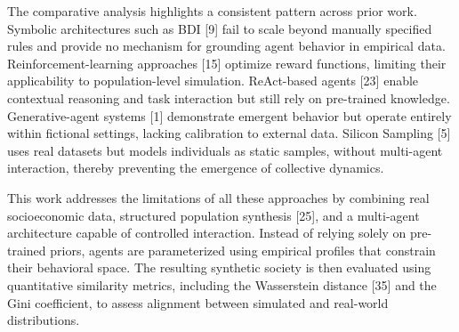 The comparative analysis highlights a consistent pattern across prior work. Symbolic architectures such as BDI [9] fail to scale beyond manually specified rules and provide no mechanism for grounding agent behavior in empirical data. Reinforcement-learning approaches [15] optimize reward functions, limiting their applicability to population-level simulation. ReAct-based agents [23] enable contextual reasoning and task interaction but still rely on pre-trained knowledge. Generative-agent systems [1] demonstrate emergent behavior but operate entirely within fictional settings, lacking calibration to external data. Silicon Sampling [5] uses real datasets but models individuals as static samples, without multi-agent interaction, thereby preventing the emergence of collective dynamics.

This work addresses the limitations of all these approaches by combining real socioeconomic data, structured population synthesis [25], and a multi-agent architecture capable of controlled interaction. Instead of relying solely on pre-trained priors, agents are parameterized using empirical profiles that constrain their behavioral space. The resulting synthetic society is then evaluated using quantitative similarity metrics, including the Wasserstein distance [35] and the Gini coefficient, to assess alignment between simulated and real-world distributions.


